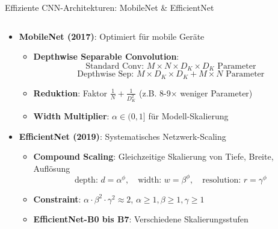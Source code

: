 \documentclass[aspectratio=1610, xcolor=dvipsnames, 9pt]{beamer}
\begin{document}
      \begin{frame}{Effiziente CNN-Architekturen: MobileNet \& EfficientNet}
        \begin{columns}
          \begin{column}{1\textwidth}
            \begin{itemize}
              \item \textbf{MobileNet (2017)}: Optimiert für mobile Geräte
              \begin{itemize}
                \item \textbf{Depthwise Separable Convolution}:
                \begin{equation}
                  \text{Standard Conv: } M \times N \times D_K \times D_K \text{ Parameter}
                \end{equation}
                \begin{equation}
                  \text{Depthwise Sep: } M \times D_K \times D_K + M \times N \text{ Parameter}
                \end{equation}
                \item \textbf{Reduktion}: Faktor $\frac{1}{N} + \frac{1}{D_K^2}$ (z.B. 8-9× weniger Parameter)
                \item \textbf{Width Multiplier}: $\alpha \in (0,1]$ für Modell-Skalierung
              \end{itemize}
              \item \textbf{EfficientNet (2019)}: Systematisches Netzwerk-Scaling
              \begin{itemize}
                \item \textbf{Compound Scaling}: Gleichzeitige Skalierung von Tiefe, Breite, Auflösung
                \begin{equation}
                  \text{depth: } d = \alpha^\phi, \quad \text{width: } w = \beta^\phi, \quad \text{resolution: } r = \gamma^\phi
                \end{equation}
                \item \textbf{Constraint}: $\alpha \cdot \beta^2 \cdot \gamma^2 \approx 2$, $\alpha \geq 1, \beta \geq 1, \gamma \geq 1$
                \item \textbf{EfficientNet-B0 bis B7}: Verschiedene Skalierungsstufen
              \end{itemize}
            \end{itemize}
          \end{column}
        \end{columns}
      \end{frame}
\end{document}
